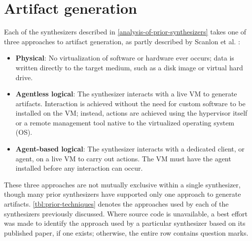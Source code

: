 \documentclass[final,5p,times,twocolumn]{elsarticle}
\begin{document}
\section{Artifact generation}\label{artifact-generation}

Each of the synthesizers described in \autoref{analysis-of-prior-synthesizers} takes one of three approaches to artifact generation, as
partly described by Scanlon et al.
\cite{scanlonEviPlantEfficientDigital2017}:

\begin{itemize}
\item
  \textbf{Physical}: No virtualization of software or hardware ever
  occurs; data is written directly to the target medium, such as a disk
  image or virtual hard drive.
\item
  \textbf{Agentless logical}: The synthesizer interacts with a live VM
  to generate artifacts. Interaction is achieved without the need for
  custom software to be installed on the VM; instead, actions are
  achieved using the hypervisor itself or a remote management tool
  native to the virtualized operating system (OS).
\item
  \textbf{Agent-based logical}: The synthesizer interacts with a
  dedicated client, or agent, on a live VM to carry out actions. The VM
  must have the agent installed before any interaction can occur.
\end{itemize}

These three approaches are not mutually exclusive within a single
synthesizer, though many prior synthesizers have supported only one
approach to generate artifacts. \autoref{tbl:prior-techniques} denotes
the approaches used by each of the synthesizers previously discussed.
Where source code is unavailable, a best effort was made to identify the
approach used by a particular synthesizer based on its published paper,
if one exists; otherwise, the entire row contains question marks.
\end{document}
